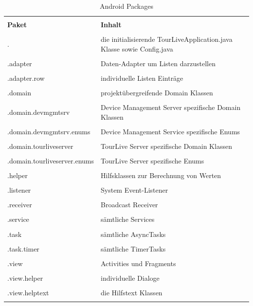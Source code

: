\begin{longtable}{>{\RaggedRight}p{5.0cm} | >{\RaggedRight}p{7.1cm}}
 & \\ [-1.5ex]
\textbf{Paket} & \textbf{Inhalt}  \\ [1ex] \hline \hline &  \\ [-1.5ex]
. & die initialisierende TourLiveApplication.java Klasse sowie Config.java  \\ [1ex] \hline &  \\ [-1.5ex]
.adapter & Daten-Adapter um Listen darzustellen \\ [1ex] \hline &  \\ [-1.5ex]
.adapter.row & individuelle Listen Einträge \\ [1ex] \hline &  \\ [-1.5ex]
.domain & projektübergreifende Domain Klassen \\ [1ex] \hline &  \\ [-1.5ex]
.domain.devmgmtsrv & Device Management Server spezifische Domain Klassen \\ [1ex] \hline &  \\ [-1.5ex]
.domain.devmgmtsrv.enums & Device Management Service spezifische Enums \\ [1ex] \hline &  \\ [-1.5ex]
.domain.tourliveserver & TourLive Server spezifische Domain Klassen\\ [1ex] \hline &  \\ [-1.5ex]
.domain.tourliveserver.enums & TourLive Server spezifische Enums \\ [1ex] \hline &  \\ [-1.5ex]
.helper & Hilfsklassen zur Berechnung von Werten \\ [1ex] \hline &  \\ [-1.5ex]
.listener & System Event-Listener \\ [1ex] \hline &  \\ [-1.5ex]
.receiver & Broadcast Receiver \\ [1ex] \hline &  \\ [-1.5ex]
.service & sämtliche Services \\ [1ex] \hline &  \\ [-1.5ex]
.task & sämtliche AsyncTasks \\ [1ex] \hline &  \\ [-1.5ex]
.task.timer & sämtliche TimerTasks \\ [1ex] \hline &  \\ [-1.5ex]
.view & Activities und Fragments \\ [1ex] \hline &  \\ [-1.5ex]
.view.helper & individuelle Dialoge \\ [1ex] \hline &  \\ [-1.5ex]
.view.helptext & die Hilfstext Klassen \\ [1ex]
\caption{Android Packages}
\end{longtable} 

